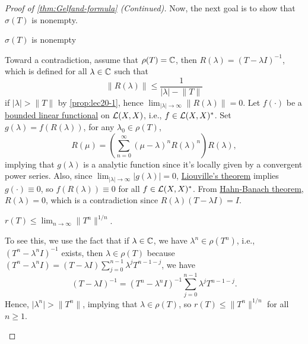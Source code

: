 \begin{proof}[Proof of \autoref{thm:Gelfand-formula} (Continued)]
	Now, the next goal is to show that \(\sigma (T)\) is nonempty.
	\begin{claim}
		\(\sigma (T)\) is nonempty
	\end{claim}
	\begin{explanation}
		Toward a contradiction, assume that \(\rho (T) = \mathbb{\MakeUppercase{c}} \), then \(R(\lambda ) = (T-\lambda I)^{-1} \), which is defined for all \(\lambda \in \mathbb{\MakeUppercase{c}} \) such that
		\[
			\lVert R(\lambda ) \rVert \leq \frac{1}{\vert \lambda  \vert - \lVert T \rVert }
		\]
		if \(\vert \lambda  \vert > \lVert T \rVert \) by \autoref{prop:lec20-1}, hence \(\lim_{\vert \lambda  \vert \to \infty} \lVert R(\lambda ) \rVert = 0\). Let \(f(\cdot)\) be a \hyperref[def:bounded-linear-functional]{bounded linear functional} on \(\mathcal{\MakeUppercase{l}} (X, X)\), i.e., \(f\in \mathcal{\MakeUppercase{l}} (X, X)^{\ast} \). Set \(g(\lambda ) = f(R(\lambda ))\), for any \(\lambda _0\in \rho (T)\),
		\[
			R(\mu ) = \left( \sum_{n=0}^{\infty} (\mu -\lambda )^n R(\lambda )^n  \right) R(\lambda ),
		\]
		implying that \(g(\lambda )\) is a analytic function since it's locally given by a convergent power series. Also, since \(\lim_{\vert \lambda \vert \to \infty} \vert g(\lambda ) \vert = 0\), \href{https://en.wikipedia.org/wiki/Liouville's_theorem_(complex_analysis)}{Liouville's theorem} implies \(g(\cdot) \equiv 0\), so \(f(R(\lambda ))\equiv 0\) for all \(f\in \mathcal{\MakeUppercase{l}} (X, X)^{\ast} \). From \hyperref[thm:Hahn-Banach]{Hahn-Banach theorem}, \(R(\lambda ) = 0\), which is a contradiction since \(R(\lambda )(T-\lambda I) = I\).
	\end{explanation}

	\begin{claim}
		\(r(T) \leq \lim_{n \to \infty} \lVert T^n \rVert ^{1 / n}\).
	\end{claim}
	\begin{explanation}
		To see this, we use the fact that if \(\lambda \in \mathbb{\MakeUppercase{c}} \), we have \(\lambda ^n \in \rho (T^n)\), i.e., \((T^n - \lambda ^n I)^{-1} \) exists, then \(\lambda \in \rho (T)\) because \((T^n - \lambda ^n I) = (T - \lambda I)\sum_{j=0}^{n-1} \lambda ^j T^{n-1-j}\), we have
		\[
			(T-\lambda I)^{-1} = (T^n - \lambda ^n I)^{-1} \sum_{j=0}^{n-1} \lambda ^j T^{n-1-j}.
		\]
		Hence, \(\vert \lambda ^n \vert > \lVert T^n \rVert \), implying that \(\lambda \in \rho (T)\), so \(r(T) \leq \lVert T^n \rVert ^{1 / n}\) for all \(n\geq 1\).
	\end{explanation}


\end{proof}

